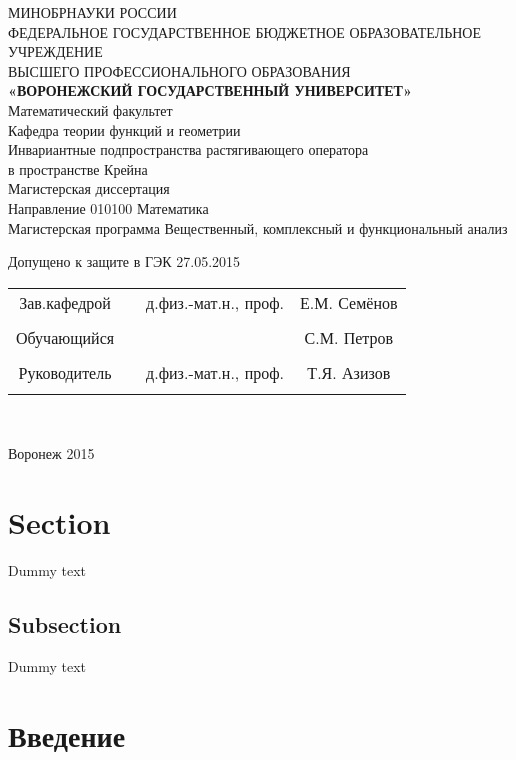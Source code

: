 \documentclass[a4paper]{article}
\begin{document}
 
\begin{center}
\hfill \break
\large{МИНОБРНАУКИ РОССИИ}\\
\footnotesize{ФЕДЕРАЛЬНОЕ ГОСУДАРСТВЕННОЕ БЮДЖЕТНОЕ ОБРАЗОВАТЕЛЬНОЕ УЧРЕЖДЕНИЕ}\\ 
\footnotesize{ВЫСШЕГО ПРОФЕССИОНАЛЬНОГО ОБРАЗОВАНИЯ}\\
\small{\textbf{«ВОРОНЕЖСКИЙ ГОСУДАРСТВЕННЫЙ УНИВЕРСИТЕТ»}}\\
\hfill \break
\normalsize{Математический факультет}\\
 \hfill \break
\normalsize{Кафедра теории функций и  геометрии}\\
\hfill\break
\hfill \break
\hfill \break
\hfill \break
\large{Инвариантные подпространства растягивающего оператора\\ в пространстве Крейна}\\
\hfill \break
\hfill \break
\hfill \break
\normalsize{Магистерская диссертация\\
\hfill \break
Направление  010100 Математика\\
\hfill \break
Магистерская программа    Вещественный, комплексный и функциональный анализ}\\
\hfill \break
\hfill \break
\end{center}
 
\normalsize{ \hspace{28pt} Допущено к защите в ГЭК  27.05.2015} \hfill \break
\hfill \break
 
\normalsize{ 
\begin{tabular}{cccc}
Зав.кафедрой & \underline{\hspace{3cm}} &  д.физ.-мат.н.,  проф. & Е.М. Семёнов \\\\
Обучающийся & \underline{\hspace{3cm}} & &С.М. Петров \\\\
Руководитель & \underline{\hspace{3cm}}& д.физ.-мат.н., проф.&  Т.Я. Азизов \\\\
\end{tabular}
}\\
\hfill \break
\hfill \break
\begin{center} Воронеж 2015 \end{center}
\thispagestyle{empty} %
 
 
\newpage
     
    \tableofcontents
    \newpage
\section{Section}

Dummy text

\subsection{Subsection}

Dummy text
\newpage
 
\newpage
\section{Введение}
 
 
\end{document}
